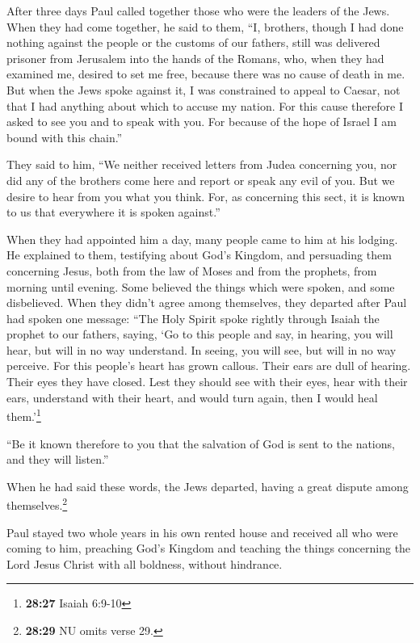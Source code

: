  After three days Paul called together those who were the
leaders of the Jews. When they had come together, he said to them, ``I,
brothers, though I had done nothing against the people or the customs of
our fathers, still was delivered prisoner from Jerusalem into the hands
of the Romans,  who, when they had examined me, desired
to set me free, because there was no cause of death in me.
 But when the Jews spoke against it, I was constrained to
appeal to Caesar, not that I had anything about which to accuse my
nation.  For this cause therefore I asked to see you and
to speak with you. For because of the hope of Israel I am bound with
this chain.''

 They said to him, ``We neither received letters from
Judea concerning you, nor did any of the brothers come here and report
or speak any evil of you.  But we desire to hear from you
what you think. For, as concerning this sect, it is known to us that
everywhere it is spoken against.''

 When they had appointed him a day, many people came to
him at his lodging. He explained to them, testifying about God's
Kingdom, and persuading them concerning Jesus, both from the law of
Moses and from the prophets, from morning until evening. 
Some believed the things which were spoken, and some disbelieved.
 When they didn't agree among themselves, they departed
after Paul had spoken one message: ``The Holy Spirit spoke rightly
through Isaiah the prophet to our fathers,  saying, `Go
to this people and say, in hearing, you will hear, but will in no way
understand. In seeing, you will see, but will in no way perceive.
 For this people's heart has grown callous. Their ears
are dull of hearing. Their eyes they have closed. Lest they should see
with their eyes, hear with their ears, understand with their heart, and
would turn again, then I would heal them.'\footnote{\textbf{28:27}
  Isaiah 6:9-10}

 ``Be it known therefore to you that the salvation of God
is sent to the nations, and they will listen.''

 When he had said these words, the Jews departed, having
a great dispute among themselves.\footnote{\textbf{28:29} NU omits verse
  29.}

 Paul stayed two whole years in his own rented house and
received all who were coming to him,  preaching God's
Kingdom and teaching the things concerning the Lord Jesus Christ with
all boldness, without hindrance.
